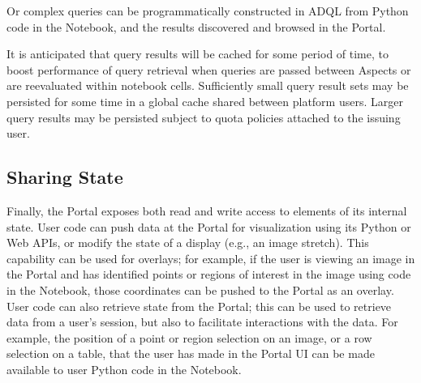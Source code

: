 Or complex queries can be programmatically constructed in ADQL from Python code in the Notebook, and the results discovered and browsed in the Portal.

It is anticipated that query results will be cached for some period of time, to boost performance of query retrieval when queries are passed between Aspects or are reevaluated within notebook cells.  Sufficiently small query result sets may be persisted for some time in a global cache shared between platform users.  Larger query results may be persisted subject to quota policies attached to the issuing user.

\subsection{Sharing State}\label{sharing-state}

Finally, the Portal exposes both read and write access to elements of its internal state.
User code can push data at the Portal for visualization using its Python or Web APIs, or modify the state of a display (e.g., an image stretch).
This capability can be used for overlays; for example, if the user is viewing an image in the Portal and has identified points or regions of interest in the image using code in the Notebook, those coordinates can be pushed to the Portal as an overlay.
User code can also retrieve state from the Portal; this can be used to retrieve data from a user's session, but also to facilitate interactions with the data.
For example, the position of a point or region selection on an image, or a row selection on a table, that the user has made in the Portal UI can be made available to user Python code in the Notebook.
